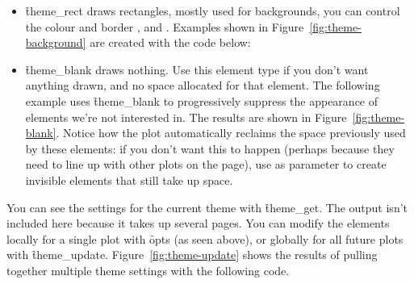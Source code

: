 \begin{itemize}
  \item \f{theme_rect} draws rectangles, mostly used for backgrounds, you can control the  colour and border ,  and .  Examples shown in Figure~\ref{fig:theme-background} are created with the code below:   
  
    

  \item \f{theme_blank} draws nothing.  Use this element type if you don't want anything drawn, and no space allocated for that element.  The following example uses \f{theme_blank} to progressively suppress the appearance of elements we're not interested in. The results are shown in Figure~\ref{fig:theme-blank}.  Notice how the plot automatically reclaims the space previously used by these elements: if you don't want this to happen (perhaps because they need to line up with other plots on the page), use  as parameter to create invisible elements that still take up space. 

    

\end{itemize}

You can see the settings for the current theme with \f{theme_get}.  The output isn't included here because it takes up several pages.  You can modify the elements locally for a single plot with \f{opts} (as seen above), or globally for all future plots with \f{theme_update}.  Figure~\ref{fig:theme-update} shows the results of pulling together multiple theme settings with the following code.   

